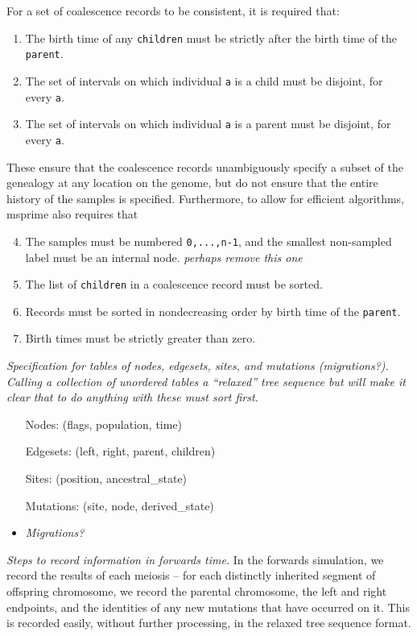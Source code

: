 \documentclass{article}
\newcommand{\plr}[1]{{\em \color{blue} #1}}
\begin{document}
For a set of coalescence records to be consistent,
it is required that:
\begin{enumerate}
    \item The birth time of any \texttt{children} must be strictly after the birth time of the \texttt{parent}.
    \item The set of intervals on which individual \texttt{a} is a child must be disjoint, for every \texttt{a}.
    \item The set of intervals on which individual \texttt{a} is a parent must be disjoint, for every \texttt{a}.
\end{enumerate}
These ensure that the coalescence records unambiguously specify a subset of the genealogy at any location on the genome,
but do not ensure that the entire history of the samples is specified.
Furthermore, to allow for efficient algorithms, msprime also requires that
\begin{enumerate} \setcounter{enumi}{3}
    \item The samples must be numbered \texttt{0,...,n-1}, and the smallest non-sampled label must be an internal node.
        \plr{perhaps remove this one}
    \item The list of \texttt{children} in a coalescence record must be sorted.
    \item Records must be sorted in nondecreasing order by birth time of the \texttt{parent}.
    \item Birth times must be strictly greater than zero.
\end{enumerate}


\plr{Specification for tables of nodes, edgesets, sites, and mutations (migrations?).}
\plr{Calling a collection of unordered tables a ``relaxed'' tree sequence
    but will make it clear that to do anything with these must sort first.}

\begin{itemize}
    \item[Nodes:]
        (flags, population, time)
    \item[Edgesets:]
        (left,  right,  parent,  children)
    \item[Sites:]
        (position,  ancestral\_state)
    \item[Mutations:]
        (site,  node,  derived\_state)
    \item \plr{Migrations?}
\end{itemize}


\plr{Steps to record information in forwards time.}
In the forwards simulation,
we record the results of each meiosis --
for each distinctly inherited segment of offspring chromosome,
we record the parental chromosome,
the left and right endpoints,
and the identities of any new mutations that have occurred on it.
This is recorded easily, without further processing,
in the relaxed tree sequence format.
\end{document}
